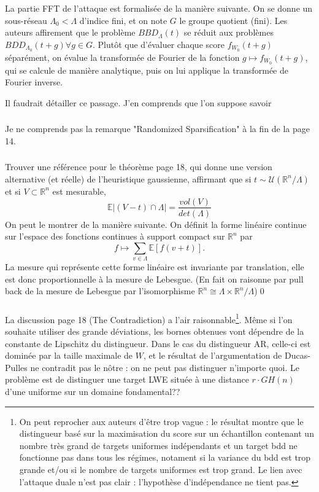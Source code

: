 \documentclass{article}
\begin{document}
La partie FFT de l'attaque est formalisée de la manière suivante. On se donne un sous-réseau $\Lambda_0 < \Lambda $ d'indice fini, et on note $G$ le groupe quotient (fini). Les auteurs affirement que le problème $BBD_{\Lambda}(t)$ se réduit aux problèmes $BDD_{\Lambda_0}(t+g) \forall g \in G$. Plutôt que d'évaluer chaque score $f_{W_0}(t+g)$ séparément, on évalue la transformée de Fourier de la fonction $g \mapsto  f_{W_0}(t+g)$, qui se calcule de manière analytique, puis on lui applique la transformée de Fourier inverse.

Il faudrait détailler ce passage. J'en comprends que l'on suppose savoir 

\subsubsection{}
Je ne comprends pas la remarque "Randomized Sparsification" à la fin de la page 14.	

\subsubsection{}
Trouver une référence pour le théorème page 18, qui donne une version alternative (et réelle) de l'heuristique gaussienne, affirmant que si $t\sim \mathcal U(\mathbb R^n/\Lambda)$ et si $V\subset \mathbb R^n$ est mesurable, 
$$\mathbb E|(V -t)\cap \Lambda | = \frac{vol(V)}{det(\Lambda)}$$
On peut le montrer de la manière suivante. On définit la forme linéaire continue sur l'espace des fonctions continues à support compact sur $\mathbb R^n$ par 
$$f\mapsto \sum_{v\in \Lambda} \mathbb E[f(v+t )]. $$
La mesure qui représente cette forme linéaire est invariante par translation, elle est donc proportionnelle à la mesure de Lebesgue. (En fait on raisonne par pull back de la mesure de Lebesgue par l'isomorphisme $\mathbb R^n \cong \Lambda \times \mathbb R^n /\Lambda$)\qed 

\subsubsection{}

La discussion page 18 (The Contradiction) a l'air raisonnable\footnote{On peut reprocher aux auteurs d'être trop vague : le résultat montre que le distingueur basé sur la maximisation du score sur un échantillon contenant un nombre très grand de targets uniformes indépendants et un target bdd ne fonctionne pas dans tous les régimes, notament si la variance du bdd est trop grande et/ou si le nombre de targets uniformes est trop grand. Le lien avec l'attaque duale n'est pas clair : l'hypothèse d'indépendance ne tient pas.}. Même si l'on souhaite utiliser des grande déviations, les bornes obtenues vont dépendre de la constante de Lipschitz du distingueur. Dans le cas du distingueur AR, celle-ci est dominée par la taille maximale de $W$, et le résultat de l'argumentation de Ducas-Pulles ne contradit pas le nôtre : on ne peut pas distinguer n'importe quoi. Le problème est de distinguer une target LWE située à une distance $r\cdot GH(n)$ d'une uniforme sur un domaine fondamental?? 
\end{document}
